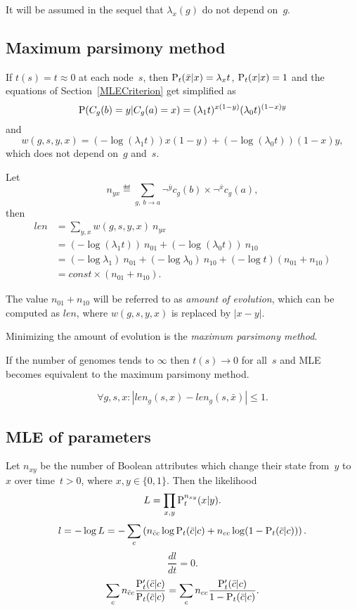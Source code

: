 \documentclass[10pt,a4paper]{article}
\theoremstyle{plain} \newtheorem{Lem}{Lemma}
\begin{document}
It will be assumed in the sequel that $\lambda_x(g)$ do not depend on~$g$.


\subsection {Maximum parsimony method}

If $t(s) = t \approx 0$ at each node~$s$,
then $ \P_t(\bar x|x) = \lambda_x t$, $ \P_t(x|x) = 1$
and the equations of Section~\ref{MLECriterion} get simplified as
$$ \P(C_g(b)=y|C_g(a)=x) = (\lambda_1 t)^{x (1-y)} (\lambda_0 t)^{(1-x) y} $$
and
$$ w(g,s,y,x) = (- \log (\lambda_1 t)) x (1-y) + (- \log (\lambda_0 t)) (1-x) y, $$
which does not depend on~$g$ and~$s $.

Let
$$ n_{yx} \eqdef \sum_{g, \ b \to a}  \neg^{\bar y} c_g(b) \times \neg^{\bar x} c_g(a), $$
then
\begin{equation*}
\begin{split}
 len &= \sum_{y,x} w(g,s,y,x) \ n_{yx} \\
     &= (- \log (\lambda_1 t)) \ n_{01} + (- \log (\lambda_0 t)) \ n_{10}  \\
     &= (-\log \lambda_1) \ n_{01} + (- \log \lambda_0) \ n_{10} + (- \log t) (n_{01} + n_{10}) \\
     &= const \times (n_{01} + n_{10}).
\end{split}
\end{equation*}

The value $n_{01} + n_{10}$ will be referred to as {\em amount of evolution},
which can be computed as $len$, where $w(g,s,y,x)$ is replaced by $|x - y|$.

Minimizing the amount of evolution is the {\em maximum parsimony method}.

If the number of genomes tends to $\infty$ then $t(s) \to 0$ for all~$s$ and MLE becomes equivalent to the maximum parsimony method.

$$ \forall g,s,x : |len_g (s,x) - len_g(s,\bar x)| \le 1. $$



\subsection {MLE of parameters}
Let $n_{xy}$ be the number of Boolean attributes which change their state from~$y$ to~$x$ over time~$t > 0$, where $x,y \in \{0,1\}$.
Then the likelihood
$$ L = \prod_{x,y} \P_t^{n_{xy}}(x|y). $$
$$ l = - \log L = - \sum_c \left(   n_{\bar c c} \log      \P_t(\bar c|c)
                                  + n_{     c c} \log (1 - \P_t(\bar c|c)) \right). $$
$$ \frac {d l} {d t} = 0. $$
\begin{equation} \label{t_mle}
\sum_c n_{\bar c c} \frac {\P'_t(\bar c|c)} {\P_t(\bar c|c)} = \sum_c n_{c c} \frac {\P'_t(\bar c|c)} {1 - \P_t(\bar c|c)}.
\end{equation}
\end{document}
